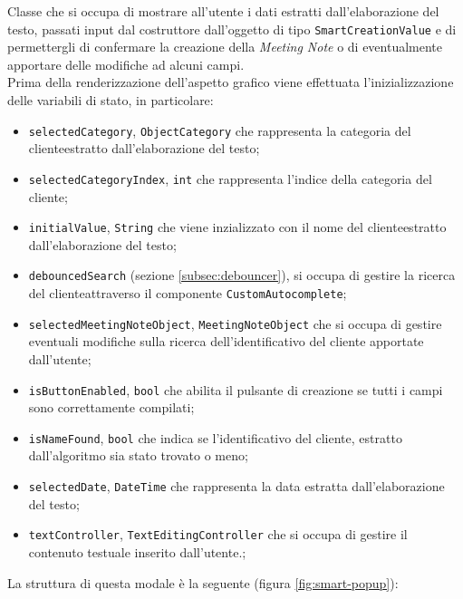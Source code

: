 Classe che si occupa di mostrare all'utente i dati estratti dall'elaborazione del testo, passati input dal costruttore dall'oggetto di tipo \lstinline{SmartCreationValue} e di permettergli di confermare la creazione della \emph{Meeting Note} o di eventualmente apportare delle modifiche ad alcuni campi. \\
Prima della renderizzazione dell'aspetto grafico viene effettuata l'inizializzazione delle variabili di stato, in particolare:
\begin{itemize}
    \item \lstinline{selectedCategory}, \lstinline{ObjectCategory} che rappresenta la categoria del \gls{cliente}\glsoccur estratto dall'elaborazione del testo;
    \item \lstinline{selectedCategoryIndex}, \lstinline{int} che rappresenta l'indice della categoria del \gls{cliente}\glsoccur;
    \item \lstinline{initialValue}, \lstinline{String} che viene inzializzato con il nome del \gls{cliente}\glsoccur estratto dall'elaborazione del testo;
    \item \lstinline{debouncedSearch} (sezione \ref{subsec:debouncer}), si occupa di gestire la ricerca del \gls{cliente}\glsoccur attraverso il componente \lstinline{CustomAutocomplete};
    \item \lstinline{selectedMeetingNoteObject}, \lstinline{MeetingNoteObject} che si occupa di gestire eventuali modifiche sulla ricerca dell'identificativo del cliente apportate dall'utente;
    \item \lstinline{isButtonEnabled}, \lstinline{bool} che abilita il pulsante di creazione se tutti i campi sono correttamente compilati;
    \item \lstinline{isNameFound}, \lstinline{bool} che indica se l'identificativo del \gls{cliente}\glsoccur, estratto dall'algoritmo sia stato trovato o meno;
    \item \lstinline{selectedDate}, \lstinline{DateTime} che rappresenta la data estratta dall'elaborazione del testo;
    \item \lstinline{textController}, \lstinline{TextEditingController} che si occupa di gestire il contenuto testuale inserito dall'utente.;
\end{itemize}
La struttura di questa modale è la seguente (figura \ref{fig:smart-popup}):
